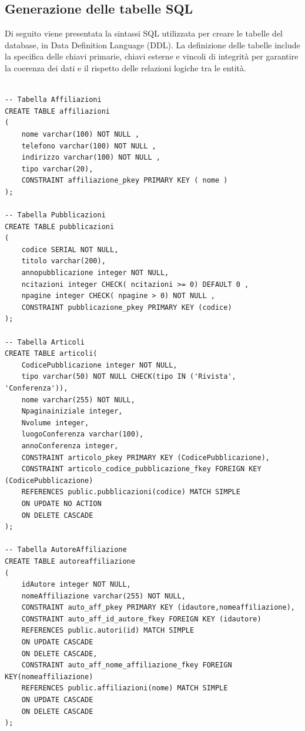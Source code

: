 \documentclass[a4paper,12pt]{article}
\begin{document}
\subsection{Generazione delle tabelle SQL}
Di seguito viene presentata la sintassi SQL utilizzata per creare le tabelle del database, in Data Definition Language (DDL). La definizione delle tabelle include la specifica delle chiavi primarie, chiavi esterne e vincoli di integrità per garantire la coerenza dei dati e il rispetto delle relazioni logiche tra le entità.

\begin{lstlisting}

-- Tabella Affiliazioni
CREATE TABLE affiliazioni
(
    nome varchar(100) NOT NULL ,
    telefono varchar(100) NOT NULL ,
    indirizzo varchar(100) NOT NULL ,
    tipo varchar(20),
    CONSTRAINT affiliazione_pkey PRIMARY KEY ( nome )
);

-- Tabella Pubblicazioni
CREATE TABLE pubblicazioni
(
    codice SERIAL NOT NULL,
    titolo varchar(200),
    annopubblicazione integer NOT NULL,
    ncitazioni integer CHECK( ncitazioni >= 0) DEFAULT 0 ,
    npagine integer CHECK( npagine > 0) NOT NULL ,
    CONSTRAINT pubblicazione_pkey PRIMARY KEY (codice)
);

-- Tabella Articoli
CREATE TABLE articoli(
    CodicePubblicazione integer NOT NULL,
    tipo varchar(50) NOT NULL CHECK(tipo IN ('Rivista', 'Conferenza')),
    nome varchar(255) NOT NULL,
    Npaginainiziale integer,
    Nvolume integer,
    luogoConferenza varchar(100),
    annoConferenza integer,
    CONSTRAINT articolo_pkey PRIMARY KEY (CodicePubblicazione),
    CONSTRAINT articolo_codice_pubblicazione_fkey FOREIGN KEY (CodicePubblicazione)
    REFERENCES public.pubblicazioni(codice) MATCH SIMPLE
    ON UPDATE NO ACTION
    ON DELETE CASCADE
);

-- Tabella AutoreAffiliazione
CREATE TABLE autoreaffiliazione
(
    idAutore integer NOT NULL,
    nomeAffiliazione varchar(255) NOT NULL,
    CONSTRAINT auto_aff_pkey PRIMARY KEY (idautore,nomeaffiliazione),
    CONSTRAINT auto_aff_id_autore_fkey FOREIGN KEY (idautore)
    REFERENCES public.autori(id) MATCH SIMPLE
    ON UPDATE CASCADE
    ON DELETE CASCADE,
    CONSTRAINT auto_aff_nome_affiliazione_fkey FOREIGN KEY(nomeaffiliazione)
    REFERENCES public.affiliazioni(nome) MATCH SIMPLE
    ON UPDATE CASCADE
    ON DELETE CASCADE
);


\end{lstlisting}
\end{document}
